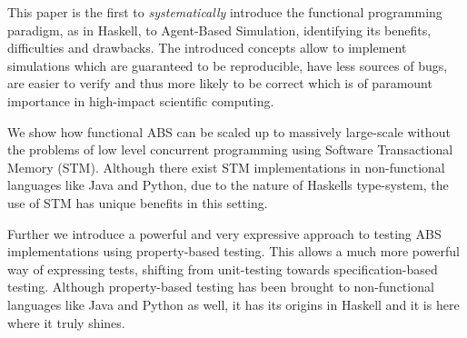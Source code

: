 \begin{itemize*}
	\item This paper is the first to \textit{systematically} introduce the functional programming paradigm, as in Haskell, to Agent-Based Simulation, identifying its benefits, difficulties and drawbacks. The introduced concepts allow to implement simulations which are guaranteed to be reproducible, have less sources of bugs, are easier to verify and thus more likely to be correct which is of paramount importance in high-impact scientific computing. 
	\item We show how functional ABS can be scaled up to massively large-scale without the problems of low level concurrent programming using Software Transactional Memory (STM). Although there exist STM implementations in non-functional languages like Java and Python, due to the nature of Haskells type-system, the use of STM has unique benefits in this setting.
	\item Further we introduce a powerful and very expressive approach to testing ABS implementations using property-based testing. This allows a much more powerful way of expressing tests, shifting from unit-testing towards specification-based testing. Although property-based testing has been brought to non-functional languages like Java and Python as well, it has its origins in Haskell and it is here where it truly shines.
\end{itemize*}
